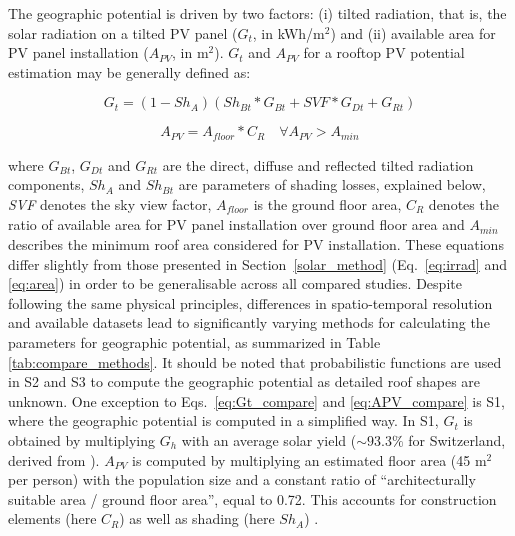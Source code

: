 The geographic potential is driven by two factors: (i) tilted radiation, that is, the solar radiation on a tilted PV panel ($G_t$, in kWh/m$^2$) and (ii) available area for PV panel installation ($A_{PV}$, in m$^2$). $G_t$ and $A_{PV}$ for a rooftop PV potential estimation may be generally defined as:

\begin{equation}
\label{eq:Gt_compare}
    G_t = (1 - Sh_A) (Sh_{Bt} * G_{Bt} + \mathit{SVF} * G_{Dt} + G_{Rt})
\end{equation}

\begin{equation}
\label{eq:APV_compare}
    A_{PV} = A_{\mathit{floor}} * C_R \quad \forall A_{PV} > A_{min} 
\end{equation}

where $G_{Bt}$, $G_{Dt}$ and $G_{Rt}$ are the direct, diffuse and reflected tilted radiation components, $Sh_A$ and $Sh_{Bt}$ are parameters of shading losses, explained below, \textit{SVF} denotes the sky view factor, $A_{\mathit{floor}}$ is the ground floor area, $C_R$ denotes the ratio of available area for PV panel installation over ground floor area and $A_{min}$ describes the minimum roof area considered for PV installation. 
These equations differ slightly from those presented in Section~\ref{solar_method} (Eq.~\ref{eq:irrad} and \ref{eq:area}) in order to be generalisable across all compared studies. 
Despite following the same physical principles, differences in spatio-temporal resolution and available datasets lead to significantly varying methods for calculating the parameters for geographic potential, as summarized in Table \ref{tab:compare_methods}. It should be noted that probabilistic functions are used in S2 and S3 to compute the geographic potential as detailed roof shapes are unknown. One exception to Eqs.~\ref{eq:Gt_compare} and \ref{eq:APV_compare} is S1, where the geographic potential is computed in a simplified way. In S1, $G_t$ is obtained by multiplying $G_h$ with an average solar yield ($\sim 93.3\%$ for Switzerland, derived from \cite{iea_potential_2002}). $A_{PV}$ is computed by multiplying an estimated floor area (45 m$^2$ per person) with the population size and a constant ratio of “architecturally suitable area / ground floor area”, equal to 0.72. This accounts for construction elements (here $C_R$) as well as shading (here $Sh_A$) \cite{iea_potential_2002}.

